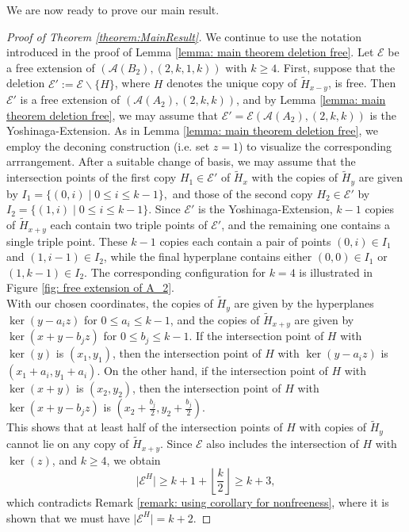 \documentclass[12pt]{amsart}
\theoremstyle{definition}
\theoremstyle{remark}
\newcommand\CA{{\mathscr A}}
\newcommand\CE{{\mathscr E}}
\begin{document}
We are now ready to prove our main result.
\begin{proof}[Proof of Theorem \ref{theorem:MainResult}]
    We continue to use the notation introduced in the proof of Lemma \ref{lemma: main theorem deletion free}. Let $\CE$ be a free extension of $(\CA(B_2),(2,k,1,k))$ with $k\geq 4$. First, suppose that the deletion $\CE':=\CE\backslash\{H\}$, where $H$ denotes the unique copy of $\tilde H_{x-y}$, is free. Then $\CE'$ is a free extension of $(\CA(A_2),(2,k,k))$, and by Lemma \ref{lemma: main theorem deletion free}, we may assume that $\CE'=\CE(\CA(A_2),(2,k,k))$ is the Yoshinaga-Extension. As in Lemma \ref{lemma: main theorem deletion free}, we employ the deconing construction (i.e. set $z=1$) to visualize the corresponding arrrangement. After a suitable change of basis, we may assume that the intersection points of the first copy $H_1\in\CE'$ of $\tilde H_x$ with the copies of $\tilde H_y$ are given by $I_1=\{(0,i)\mid 0\leq i\leq k-1\},$ and those of the second copy $H_2\in\CE'$ by $I_2=\{(1,i)\mid 0\leq i\leq k-1\}$. Since $\CE'$ is the Yoshinaga-Extension, $k-1$ copies of $\tilde H_{x+y}$ each contain two triple points of $\CE'$, and the remaining one contains a single triple point. These $k-1$ copies each contain a pair of points $(0,i)\in I_1$ and $(1,i-1)\in I_2$, while the final hyperplane contains either $(0,0)\in I_1$ or $(1,k-1)\in I_2$. The corresponding configuration for $k=4$ is illustrated in Figure \ref{fig: free extension of A_2}.\\
    With our chosen coordinates, the copies of $\tilde H_y$ are given by the hyperplanes $\ker(y-a_iz)$ for $0\leq a_i\leq k-1$, and the copies of $\tilde H_{x+y}$ are given by $\ker(x+y-b_jz)$ for $0\leq b_j\leq k-1$. If the intersection point of $H$ with $\ker(y)$ is $(x_1,y_1)$, then the intersection point of $H$ with $\ker(y-a_iz)$ is $(x_1+a_i,y_1+a_i)$. On the other hand, if the intersection point of $H$ with $\ker(x+y)$ is $(x_2,y_2)$, then the intersection point of $H$ with $\ker(x+y-b_jz)$ is $(x_2+\frac{b_j}{2},y_2+\frac{b_j}{2})$.\\
    This shows that at least half of the intersection points of $H$ with copies of $\tilde H_y$ cannot lie on any copy of $\tilde H_{x+y}$. Since $\CE$ also includes the intersection of $H$ with $\ker(z)$, and $k\geq 4$, we obtain $$\vert\CE^H\vert\geq k+1+\left\lfloor\frac{k}{2}\right\rfloor\geq k+3,$$ which contradicts Remark \ref{remark: using corollary for nonfreeness}, where it is shown that we must have $\vert\CE^H\vert=k+2$.
    

\end{proof}
\end{document}

